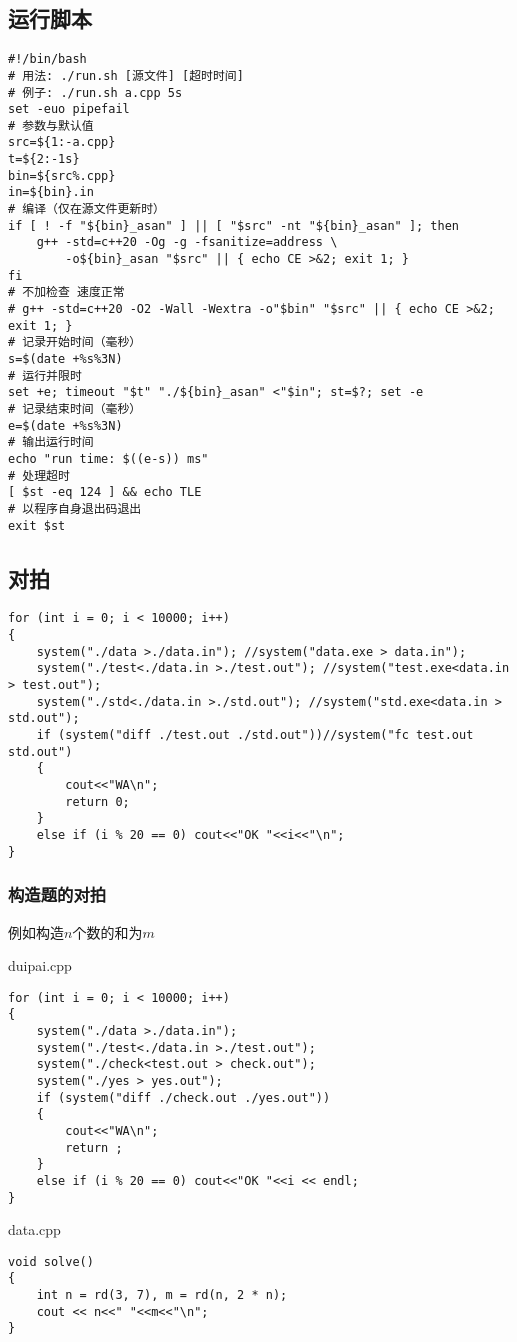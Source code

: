 \documentclass[a4paper, fontset=none]{ctexart}
\begin{document}
\subsection{运行脚本}
\begin{verbatim}
#!/bin/bash
# 用法: ./run.sh [源文件] [超时时间]
# 例子: ./run.sh a.cpp 5s
set -euo pipefail
# 参数与默认值
src=${1:-a.cpp}
t=${2:-1s}
bin=${src%.cpp}
in=${bin}.in
# 编译（仅在源文件更新时）
if [ ! -f "${bin}_asan" ] || [ "$src" -nt "${bin}_asan" ]; then
    g++ -std=c++20 -Og -g -fsanitize=address \
        -o${bin}_asan "$src" || { echo CE >&2; exit 1; }
fi
# 不加检查 速度正常
# g++ -std=c++20 -O2 -Wall -Wextra -o"$bin" "$src" || { echo CE >&2; exit 1; }
# 记录开始时间（毫秒）
s=$(date +%s%3N)
# 运行并限时
set +e; timeout "$t" "./${bin}_asan" <"$in"; st=$?; set -e
# 记录结束时间（毫秒）
e=$(date +%s%3N)
# 输出运行时间
echo "run time: $((e-s)) ms"
# 处理超时
[ $st -eq 124 ] && echo TLE
# 以程序自身退出码退出
exit $st
\end{verbatim}
\subsection{对拍}

\begin{verbatim}
for (int i = 0; i < 10000; i++)
{
    system("./data >./data.in"); //system("data.exe > data.in");
    system("./test<./data.in >./test.out"); //system("test.exe<data.in > test.out");
    system("./std<./data.in >./std.out"); //system("std.exe<data.in > std.out");
    if (system("diff ./test.out ./std.out"))//system("fc test.out std.out")
    {
        cout<<"WA\n";
        return 0;
    }
    else if (i % 20 == 0) cout<<"OK "<<i<<"\n";
}
\end{verbatim}
\subsubsection{构造题的对拍}

例如构造$n$个数的和为$m$

duipai.cpp
\begin{verbatim}
for (int i = 0; i < 10000; i++)
{
    system("./data >./data.in");
    system("./test<./data.in >./test.out");
    system("./check<test.out > check.out");
    system("./yes > yes.out");
    if (system("diff ./check.out ./yes.out"))
    {
        cout<<"WA\n";
        return ;
    }
    else if (i % 20 == 0) cout<<"OK "<<i << endl;
}
\end{verbatim}

data.cpp
\begin{verbatim}
void solve()
{
    int n = rd(3, 7), m = rd(n, 2 * n);
    cout << n<<" "<<m<<"\n";
}
\end{verbatim}
\end{document}

